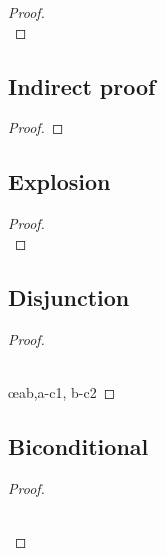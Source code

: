 \begin{multicols}{2}
\begin{proof}
\open
\close
{}

\\ 
\end{proof}

\subsection*{Indirect proof}

\begin{proof}
\open
\close
{}
\end{proof}


\subsection*{Explosion}

\begin{proof}
\\
\end{proof}

\subsection*{Disjunction}

\begin{proof}

\\	

\\	\open
	\close
	\open
	\close
	 \oe{ab,a-c1, b-c2}
\end{proof}

\subsection*{Biconditional}

\begin{proof}
	\open
	\close
	\open
	\close

\\	
	 

\\	
	 
\end{proof}

\end{multicols}

